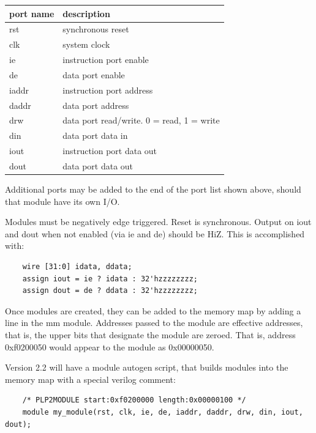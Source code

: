 \documentclass{article}
\begin{document}
\begin{tabular}{|l|l|}
  \hline
  \textbf{port name} & \textbf{description}    \\ \hline
  rst	             & synchronous reset       \\ \hline
  clk                & system clock            \\ \hline
  ie	             & instruction port enable \\ \hline
  de                 & data port enable        \\ \hline
  iaddr              & instruction port address\\ \hline
  daddr	             & data port address       \\ \hline
  drw	             & data port read/write. 0 = read, 1 = write \\ \hline
  din                & data port data in       \\ \hline
  iout               & instruction port data out\\ \hline
  dout               & data port data out      \\ \hline
\end{tabular}

Additional ports may be added to the end of the port list shown above, should that module have its own I/O.

Modules must be negatively edge triggered. Reset is synchronous. Output on iout and dout when not enabled (via ie and de) should be HiZ. This is accomplished with:

\begin{verbatim}
	wire [31:0] idata, ddata;
	assign iout = ie ? idata : 32'hzzzzzzzz;
	assign dout = de ? ddata : 32'hzzzzzzzz;
\end{verbatim}

Once modules are created, they can be added to the memory map by adding a line in the mm module. Addresses passed to the module are effective addresses, that is, the upper bits that designate the module are zeroed. That is, address 0xf0200050 would appear to the module as 0x00000050.

Version 2.2 will have a module autogen script, that builds modules into the memory map with a special verilog comment:

\begin{verbatim}
	/* PLP2MODULE start:0xf0200000 length:0x00000100 */
	module my_module(rst, clk, ie, de, iaddr, daddr, drw, din, iout, dout);
\end{verbatim}
\end{document}
